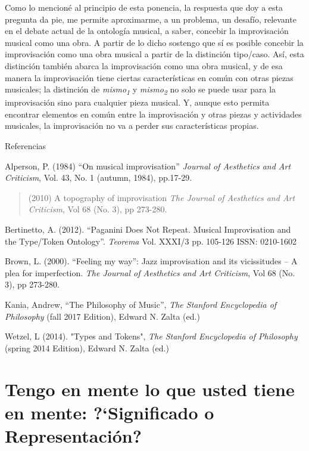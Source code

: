 \documentclass[]{book}
\begin{document}
Como lo mencioné al principio de esta ponencia, la respuesta que doy a
esta pregunta da pie, me permite aproximarme, a un problema, un desafío,
relevante en el debate actual de la ontología musical, a saber, concebir
la improvisación musical como una obra. A partir de lo dicho sostengo
que sí es posible concebir la improvisación como una obra musical a
partir de la distinción tipo/caso. Así, esta distinción también abarca
la improvisación como una obra musical, y de esa manera la improvisación
tiene ciertas características en común con otras piezas musicales; la
distinción de \emph{mismo\textsubscript{1 }}y
\emph{mismo\textsubscript{2}} no solo se puede usar para la
improvisación sino para cualquier pieza musical. Y, aunque esto permita
encontrar elementos en común entre la improvisación y otras piezas y
actividades musicales, la improvisación no va a perder sus
características propias.

Referencias

Alperson, P. (1984) ``On musical improvisation'' \emph{Journal of
Aesthetics and Art Criticism}, Vol. 43, No. 1 (autumn, 1984), pp.17-29.

\begin{quote}
(2010) A topography of improvisation \emph{The Journal of Aesthetics and
Art Criticism}, Vol 68 (No. 3), pp 273-280.
\end{quote}

Bertinetto, A. (2012). ``Paganini Does Not Repeat. Musical Improvisation
and the Type/Token Ontology''. \emph{Teorema} Vol. XXXI/3 pp. 105-126
ISSN: 0210-1602

Brown, L. (2000). ``Feeling my way'': Jazz improvisation and its
vicissitudes -- A plea for imperfection. \emph{The Journal of Aesthetics
and Art Criticism}, Vol 68 (No. 3), pp 273-280.

Kania, Andrew, ``The Philosophy of Music'', \emph{The Stanford
Encyclopedia of Philosophy} (fall 2017 Edition), Edward N. Zalta (ed.)

Wetzel, L (2014). "Types and Tokens", \emph{The Stanford Encyclopedia of
Philosophy} (spring 2014 Edition), Edward N. Zalta (ed.)

\chapter{\texorpdfstring{\textbf{Tengo en mente lo que usted tiene en
mente: ?`Significado o
Representación?}}{Tengo en mente lo que usted tiene en mente: ?`Significado o Representación?}}\label{tengo-en-mente-lo-que-usted-tiene-en-mente-significado-o-representaciuxf3n}
\end{document}
